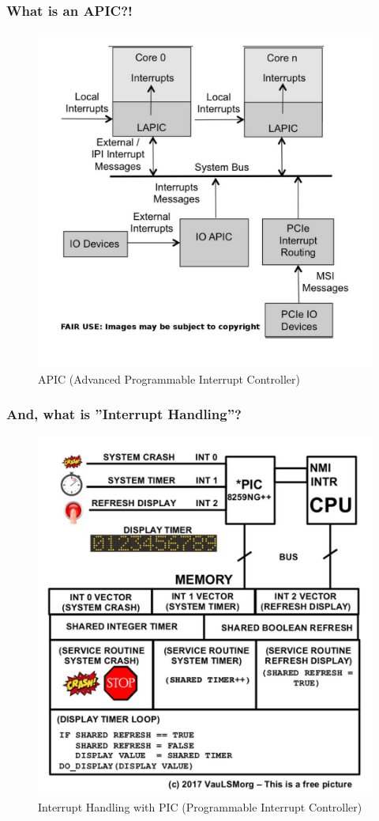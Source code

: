 \documentclass[aspectratio=169, xcolor=table, notheorems, hyperref={pdfpagelabels=false}]{beamer}
\begin{document}
\begin{frame}
\frametitle{What is an APIC?!}
\begin{figure}
\includegraphics[width=0.44\linewidth]{os00-xapic}
\caption{APIC (Advanced Programmable Interrupt Controller)}
\end{figure}
\end{frame}

\begin{frame}
\frametitle{And, what is ''Interrupt Handling''?}
\begin{figure}
\includegraphics[width=0.40\linewidth]{os00-int-protection}
\caption{Interrupt Handling with PIC (Programmable Interrupt Controller)}
\end{figure}
\end{frame}
\end{document}
